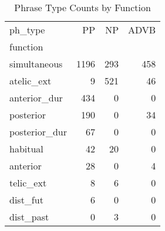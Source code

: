 \begin{table}[htbp!]
\centering
\caption{Phrase Type Counts by Function}
\label{table:funcpt_ct}
\begin{tabular}{lrrr}
\toprule
ph\_type &    PP &   NP &  ADVB \\
function      &       &      &       \\
\midrule
simultaneous  &  1196 &  293 &   458 \\
atelic\_ext    &     9 &  521 &    46 \\
anterior\_dur  &   434 &    0 &     0 \\
posterior     &   190 &    0 &    34 \\
posterior\_dur &    67 &    0 &     0 \\
habitual      &    42 &   20 &     0 \\
anterior      &    28 &    0 &     4 \\
telic\_ext     &     8 &    6 &     0 \\
dist\_fut      &     6 &    0 &     0 \\
dist\_past     &     0 &    3 &     0 \\
\bottomrule
\end{tabular}
\end{table}
